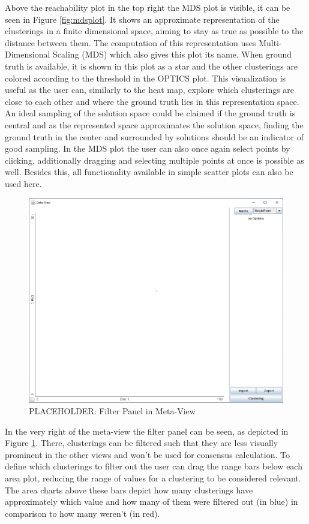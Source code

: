 \documentclass[
	a4paper,
	english,
	twoside,
	openright,               
	11pt                            
	]{report}
\begin{document}
Above the reachability plot in the top right the MDS plot is visible, it can be seen in Figure \ref{fig:mdsplot}. It shows an approximate representation of the clusterings in a finite dimensional space, aiming to stay as true as possible to the distance between them. The computation of this representation uses Multi-Dimensional Scaling (MDS) \cite{mds} which also gives this plot its name. When ground truth is available, it is shown in this plot as a star and the other clusterings are colored according to the threshold in the OPTICS plot. This visualization is useful as the user can, similarly to the heat map, explore which clusterings are close to each other and where the ground truth lies in this representation space. An ideal sampling of the solution space could be claimed if the ground truth is central and as the represented space approximates the solution space, finding the ground truth in the center and surrounded by solutions should be an indicator of good sampling. In the MDS plot the user can also once again select points by clicking, additionally dragging and selecting multiple points at once is possible as well. Besides this, all functionality available in simple scatter plots can also be used here.

\begin{figure}[h]
	\centering
	\includegraphics[scale=.45]{data-view}
	\caption{PLACEHOLDER: Filter Panel in Meta-View }
	\label{fig:filterpanel}
\end{figure}

In the very right of the meta-view the filter panel can be seen, as depicted in Figure \ref{fig:filterpanel}. There, clusterings can be filtered such that they are less visually prominent in the other views and won't be used for consensus calculation. To define which clusterings to filter out the user can drag the range bars below each area plot, reducing the range of values for a clustering to be considered relevant. The area charts above these bars depict how many clusterings have approximately which value and how many of them were filtered out (in blue) in comparison to how many weren't (in red).
\end{document}
